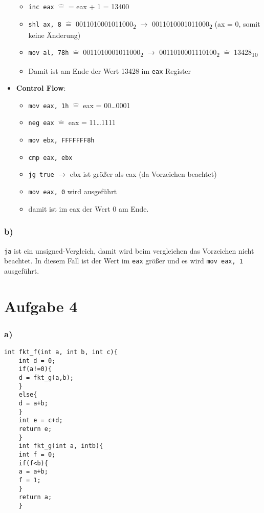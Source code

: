 \documentclass[]{scrreprt}
\begin{document}
\begin{itemize}
\begin{itemize}
			\item \texttt{inc eax} $\hat{=}$ = eax + 1 = 13400
			\item \texttt{shl ax, 8} $\hat{=}$ 0011010001011000\textsubscript{2} $\rightarrow$ 0011010001011000\textsubscript{2} (ax = 0, somit keine Änderung)
			\item  \texttt{mov al, 78h} $\hat{=}$ 0011010001011000\textsubscript{2} $\rightarrow$ 0011010001110100\textsubscript{2} $\hat{=}$ 13428\textsubscript{10}
			\item Damit ist am Ende der Wert 13428 im \texttt{eax} Register
		\end{itemize}
		
		\item \textbf{Control Flow}:
		\begin{itemize}
			\item \texttt{mov eax, 1h} $\hat{=}$ eax = 00\dots0001
			\item \texttt{neg eax} $\hat{=}$ eax = 11\dots1111
			\item \texttt{mov ebx, FFFFFFF8h}
			\item \texttt{cmp eax, ebx} 
			\item \texttt{jg true} $\rightarrow$ ebx ist größer als eax (da Vorzeichen beachtet)
			\item \texttt{mov eax, 0} wird ausgeführt
			\item damit ist im eax der Wert 0 am Ende.
		\end{itemize}
	\end{itemize}
	\subsection*{b)}
	\texttt{ja} ist ein unsigned-Vergleich, damit wird beim vergleichen das Vorzeichen nicht beachtet. In diesem Fall ist der Wert im \texttt{eax} größer und es wird \texttt{mov eax, 1} ausgeführt.
	\chapter{Aufgabe 4}
	\subsection*{a)}
	\begin{lstlisting}[caption={Funktionen f und g},captionpos=b]
	int fkt_f(int a, int b, int c){
	int d = 0;
	if(a!=0){
	d = fkt_g(a,b);
	}
	else{
	d = a+b;
	}
	int e = c+d;
	return e;
	}
	int fkt_g(int a, intb){
	int f = 0;
	if(f<b){
	a = a+b;
	f = 1;
	}
	return a;
	}
	\end{lstlisting}
\end{document}
